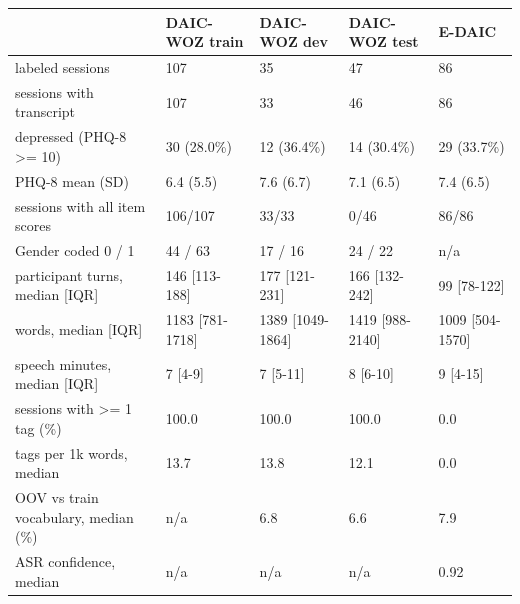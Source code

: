 \begin{tabular}{lllll}
\toprule
 & DAIC-WOZ train & DAIC-WOZ dev & DAIC-WOZ test & E-DAIC \\
\midrule
labeled sessions & 107 & 35 & 47 & 86 \\
sessions with transcript & 107 & 33 & 46 & 86 \\
depressed (PHQ-8 >= 10) & 30 (28.0\%) & 12 (36.4\%) & 14 (30.4\%) & 29 (33.7\%) \\
PHQ-8 mean (SD) & 6.4 (5.5) & 7.6 (6.7) & 7.1 (6.5) & 7.4 (6.5) \\
sessions with all item scores & 106/107 & 33/33 & 0/46 & 86/86 \\
Gender coded 0 / 1 & 44 / 63 & 17 / 16 & 24 / 22 & n/a \\
participant turns, median [IQR] & 146 [113-188] & 177 [121-231] & 166 [132-242] & 99 [78-122] \\
words, median [IQR] & 1183 [781-1718] & 1389 [1049-1864] & 1419 [988-2140] & 1009 [504-1570] \\
speech minutes, median [IQR] & 7 [4-9] & 7 [5-11] & 8 [6-10] & 9 [4-15] \\
sessions with >= 1 tag (\%) & 100.0 & 100.0 & 100.0 & 0.0 \\
tags per 1k words, median & 13.7 & 13.8 & 12.1 & 0.0 \\
OOV vs train vocabulary, median (\%) & n/a & 6.8 & 6.6 & 7.9 \\
ASR confidence, median & n/a & n/a & n/a & 0.92 \\
\bottomrule
\end{tabular}
